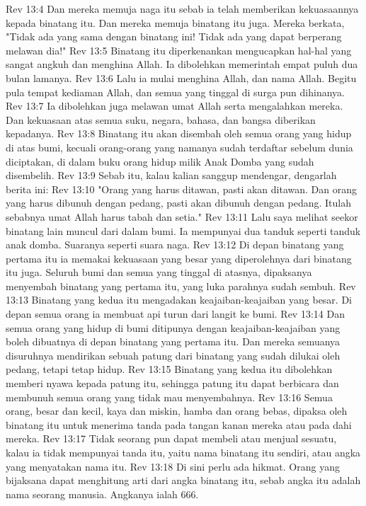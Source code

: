 Rev 13:4  Dan mereka memuja naga itu sebab ia telah memberikan kekuasaannya kepada binatang itu. Dan mereka memuja binatang itu juga. Mereka berkata, "Tidak ada yang sama dengan binatang ini! Tidak ada yang dapat berperang melawan dia!"
Rev 13:5  Binatang itu diperkenankan mengucapkan hal-hal yang sangat angkuh dan menghina Allah. Ia dibolehkan memerintah empat puluh dua bulan lamanya.
Rev 13:6  Lalu ia mulai menghina Allah, dan nama Allah. Begitu pula tempat kediaman Allah, dan semua yang tinggal di surga pun dihinanya.
Rev 13:7  Ia dibolehkan juga melawan umat Allah serta mengalahkan mereka. Dan kekuasaan atas semua suku, negara, bahasa, dan bangsa diberikan kepadanya.
Rev 13:8  Binatang itu akan disembah oleh semua orang yang hidup di atas bumi, kecuali orang-orang yang namanya sudah terdaftar sebelum dunia diciptakan, di dalam buku orang hidup milik Anak Domba yang sudah disembelih.
Rev 13:9  Sebab itu, kalau kalian sanggup mendengar, dengarlah berita ini:
Rev 13:10  "Orang yang harus ditawan, pasti akan ditawan. Dan orang yang harus dibunuh dengan pedang, pasti akan dibunuh dengan pedang. Itulah sebabnya umat Allah harus tabah dan setia."
Rev 13:11  Lalu saya melihat seekor binatang lain muncul dari dalam bumi. Ia mempunyai dua tanduk seperti tanduk anak domba. Suaranya seperti suara naga.
Rev 13:12  Di depan binatang yang pertama itu ia memakai kekuasaan yang besar yang diperolehnya dari binatang itu juga. Seluruh bumi dan semua yang tinggal di atasnya, dipaksanya menyembah binatang yang pertama itu, yang luka parahnya sudah sembuh.
Rev 13:13  Binatang yang kedua itu mengadakan keajaiban-keajaiban yang besar. Di depan semua orang ia membuat api turun dari langit ke bumi.
Rev 13:14  Dan semua orang yang hidup di bumi ditipunya dengan keajaiban-keajaiban yang boleh dibuatnya di depan binatang yang pertama itu. Dan mereka semuanya disuruhnya mendirikan sebuah patung dari binatang yang sudah dilukai oleh pedang, tetapi tetap hidup.
Rev 13:15  Binatang yang kedua itu dibolehkan memberi nyawa kepada patung itu, sehingga patung itu dapat berbicara dan membunuh semua orang yang tidak mau menyembahnya.
Rev 13:16  Semua orang, besar dan kecil, kaya dan miskin, hamba dan orang bebas, dipaksa oleh binatang itu untuk menerima tanda pada tangan kanan mereka atau pada dahi mereka.
Rev 13:17  Tidak seorang pun dapat membeli atau menjual sesuatu, kalau ia tidak mempunyai tanda itu, yaitu nama binatang itu sendiri, atau angka yang menyatakan nama itu.
Rev 13:18  Di sini perlu ada hikmat. Orang yang bijaksana dapat menghitung arti dari angka binatang itu, sebab angka itu adalah nama seorang manusia. Angkanya ialah 666.
